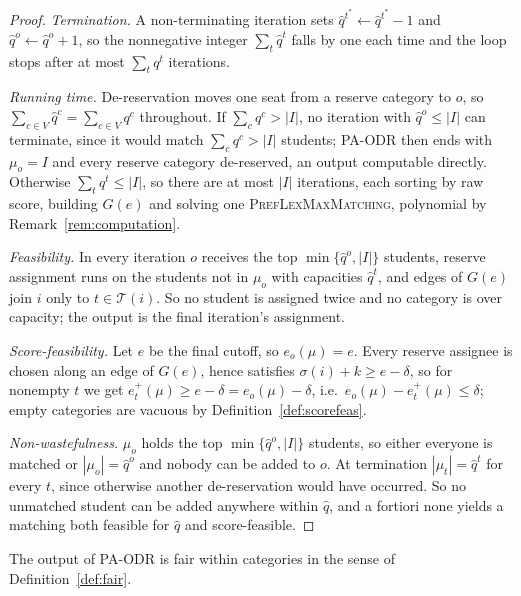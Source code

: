 \documentclass[runningheads]{llncs}
\newcommand{\T}{\mathcal{T}}
\begin{document}
\begin{proof}
\emph{Termination.} A non-terminating iteration sets $\hat q^{t^\ast}\gets\hat q^{t^\ast}-1$ and $\hat q^o\gets\hat q^o+1$, so the nonnegative integer $\sum_{t}\hat q^t$ falls by one each time and the loop stops after at most $\sum_t q^t$ iterations.

\emph{Running time.} De-reservation moves one seat from a reserve category to $o$, so $\sum_{c\in V}\hat q^c=\sum_{c\in V}q^c$ throughout. If $\sum_c q^c>|I|$, no iteration with $\hat q^o\le|I|$ can terminate, since it would match $\sum_c q^c>|I|$ students; PA-ODR then ends with $\mu_o=I$ and every reserve category de-reserved, an output computable directly. Otherwise $\sum_t q^t\le|I|$, so there are at most $|I|$ iterations, each sorting by raw score, building $G(e)$ and solving one \textsc{PrefLexMaxMatching}, polynomial by Remark~\ref{rem:computation}.

\emph{Feasibility.} In every iteration $o$ receives the top $\min\{\hat q^o,|I|\}$ students, reserve assignment runs on the students not in $\mu_o$ with capacities $\hat q^t$, and edges of $G(e)$ join $i$ only to $t\in\T(i)$. So no student is assigned twice and no category is over capacity; the output is the final iteration's assignment.

\emph{Score-feasibility.} Let $e$ be the final cutoff, so $e_o(\mu)=e$. Every reserve assignee is chosen along an edge of $G(e)$, hence satisfies $\sigma(i)+k\ge e-\delta$, so for nonempty $t$ we get $e_t^+(\mu)\ge e-\delta=e_o(\mu)-\delta$, i.e.\ $e_o(\mu)-e_t^+(\mu)\le\delta$; empty categories are vacuous by Definition~\ref{def:scorefeas}.

\emph{Non-wastefulness.} $\mu_o$ holds the top $\min\{\hat q^o,|I|\}$ students, so either everyone is matched or $|\mu_o|=\hat q^o$ and nobody can be added to $o$. At termination $|\mu_t|=\hat q^t$ for every $t$, since otherwise another de-reservation would have occurred. So no unmatched student can be added anywhere within $\hat q$, and a fortiori none yields a matching both feasible for $\hat q$ and score-feasible.
\end{proof}

\begin{proposition}
\label{prop:paodr-fair}
The output of PA-ODR is fair within categories in the sense of Definition~\ref{def:fair}.
\end{proposition}
\end{document}
